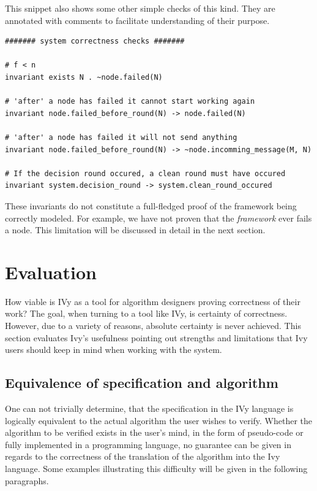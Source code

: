 \documentclass[fleqn]{article}
\begin{document}
This snippet also shows some other simple checks of this kind. They are annotated with comments to facilitate understanding of their purpose.

\begin{mdframed}[nobreak=true, backgroundcolor=light-gray, roundcorner=10pt,leftmargin=1, rightmargin=1, innerleftmargin=15, innertopmargin=15,innerbottommargin=15, outerlinewidth=1, linecolor=light-gray]
\begin{lstlisting}
####### system correctness checks #######

# f < n
invariant exists N . ~node.failed(N)

# 'after' a node has failed it cannot start working again
invariant node.failed_before_round(N) -> node.failed(N)

# 'after' a node has failed it will not send anything
invariant node.failed_before_round(N) -> ~node.incomming_message(M, N)

# If the decision round occured, a clean round must have occured
invariant system.decision_round -> system.clean_round_occured

\end{lstlisting}
\end{mdframed}

These invariants do not constitute a full-fledged proof of the framework being correctly modeled. For example, we have not proven that the \textit{framework} ever fails a node. This limitation will be discussed in detail in the next section.

\section{Evaluation}
How viable is IVy as a tool for algorithm designers proving correctness
of their work? The goal, when turning to a tool like IVy, is certainty of
correctness. However, due to a variety of reasons, absolute certainty is never achieved.
This section evaluates Ivy's usefulness pointing out strengths and limitations that Ivy users should keep in mind
when working with the system.

\subsection{Equivalence of specification and algorithm}
One can not trivially determine, that the specification in the IVy language is logically equivalent to the actual algorithm the user wishes to verify. Whether the algorithm to be verified exists in the user's mind, in the form of pseudo-code or fully implemented in a programming language, no guarantee can be given in regards to the correctness of the translation of the algorithm into the Ivy language. Some examples illustrating this difficulty will be given in the following paragraphs.
\end{document}

